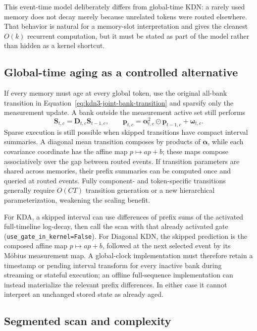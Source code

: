 \documentclass[11pt]{article}
\newcommand{\ve}[1]{\boldsymbol{#1}}
\begin{document}
This event-time model deliberately differs from global-time KDN: a rarely used memory does not
decay merely because unrelated tokens were routed elsewhere.  That behavior is natural for a
memory-slot interpretation and gives the cleanest $O(k)$ recurrent computation, but it must be
stated as part of the model rather than hidden as a kernel shortcut.

\subsection{Global-time aging as a controlled alternative}

If every memory must age at every global token, use the original all-bank transition in
Equation~\eqref{eq:kdn3-joint-bank-transition} and sparsify only the measurement update.  A bank
outside the measurement active set still performs
\begin{equation}
  \ve{S}_{t,c}=\ve{D}_{t,c}\ve{S}_{t-1,c},
  \qquad
  \ve{p}_{t,c}
  =\ve{\alpha}_{t,c}^{2}\odot\ve{p}_{t-1,c}
   +\ve{\omega}_{t,c}.
  \label{eq:kdn3-inactive-global-transition}
\end{equation}
Sparse execution is still possible when skipped transitions have compact interval summaries.  A
diagonal mean transition composes by products of $\ve{\alpha}$, while each covariance coordinate
has the affine map $p\mapsto ap+b$; these maps compose associatively over the gap between routed
events.  If transition parameters are shared across memories, their prefix summaries can be
computed once and queried at routed events.  Fully component- and token-specific transitions
generally require $O(CT)$ transition generation or a new hierarchical parameterization, weakening
the scaling benefit.

For KDA, a skipped interval can use differences of prefix sums of the activated full-timeline
log-decay, then call the scan with that already activated gate
(\texttt{use\_gate\_in\_kernel=False}).  For Diagonal KDN, the skipped prediction is the composed
affine map $p\mapsto ap+b$, followed at the next selected event by its M\"obius measurement map.  A
global-clock implementation must therefore retain a timestamp or pending interval transform for
every inactive bank during streaming or stateful execution; an offline full-sequence
implementation can instead materialize the relevant prefix differences.  In either case it cannot
interpret an unchanged stored state as already aged.

\subsection{Segmented scan and complexity}
\end{document}
